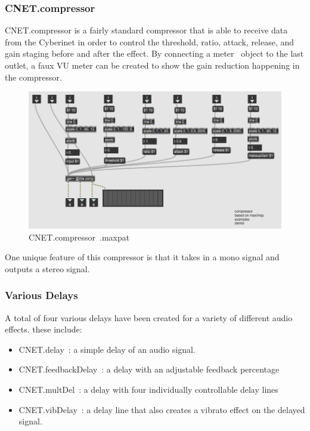 \subsubsection{CNET.compressor~}
CNET.compressor is a fairly standard compressor that is able to receive data from the Cyberinet in order to control the threshold, ratio, attack, release, and gain staging before and after the effect. By connecting a meter~ object to the last outlet, a faux VU meter can be created to show the gain reduction happening in the compressor.

\begin{figure}
    \centering
    \includegraphics{diagrams/maxPatches/CNET.compressor~.png}
    \caption{CNET.compressor~.maxpat}
    \label{fig:compmax}
\end{figure}

One unique feature of this compressor is that it takes in a mono signal and outputs a stereo signal.

\subsubsection{Various Delays}
A total of four various delays have been created for a variety of different audio effects. these include:

\begin{itemize}
    \item CNET.delay~: a simple delay of an audio signal.
    \item CNET.feedbackDelay~: a delay with an adjustable feedback percentage
    \item CNET.multDel~: a delay with four individually controllable delay lines
    \item CNET.vibDelay~: a delay line that also creates a vibrato effect on the delayed signal.
\end{itemize}

